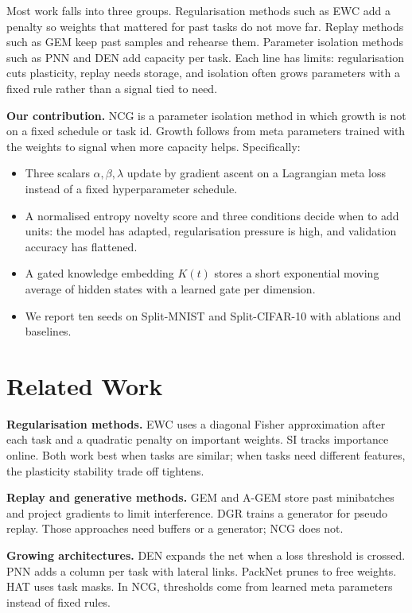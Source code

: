 \documentclass[conference]{IEEEtran}
\begin{document}
Most work falls into three groups. Regularisation methods such as EWC \cite{kirkpatrick2017} add a penalty so weights that mattered for past tasks do not move far. Replay methods such as GEM \cite{lopez2017} keep past samples and rehearse them. Parameter isolation methods such as PNN \cite{rusu2016} and DEN \cite{yoon2018} add capacity per task. Each line has limits: regularisation cuts plasticity, replay needs storage, and isolation often grows parameters with a fixed rule rather than a signal tied to need.

\textbf{Our contribution.} NCG is a parameter isolation method in which growth is not on a fixed schedule or task id. Growth follows from meta parameters trained with the weights to signal when more capacity helps. Specifically:
\begin{itemize}
    \item Three scalars $\alpha, \beta, \lambda$ update by gradient ascent on a Lagrangian meta loss instead of a fixed hyperparameter schedule.
    \item A normalised entropy novelty score and three conditions decide when to add units: the model has adapted, regularisation pressure is high, and validation accuracy has flattened.
    \item A gated knowledge embedding $K(t)$ stores a short exponential moving average of hidden states with a learned gate per dimension.
    \item We report ten seeds on Split-MNIST and Split-CIFAR-10 with ablations and baselines.
\end{itemize}

\section{Related Work}
\textbf{Regularisation methods.} EWC \cite{kirkpatrick2017} uses a diagonal Fisher approximation after each task and a quadratic penalty on important weights. SI \cite{zenke2017} tracks importance online. Both work best when tasks are similar; when tasks need different features, the plasticity stability trade off tightens.

\textbf{Replay and generative methods.} GEM \cite{lopez2017} and A-GEM \cite{chaudhry2019} store past minibatches and project gradients to limit interference. DGR \cite{shin2017} trains a generator for pseudo replay. Those approaches need buffers or a generator; NCG does not.

\textbf{Growing architectures.} DEN \cite{yoon2018} expands the net when a loss threshold is crossed. PNN \cite{rusu2016} adds a column per task with lateral links. PackNet \cite{mallya2018} prunes to free weights. HAT \cite{serra2018} uses task masks. In NCG, thresholds come from learned meta parameters instead of fixed rules.
\end{document}
